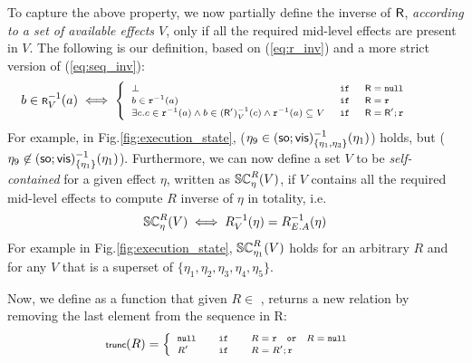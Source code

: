 To capture the above property, we now partially define the 
inverse of ${\normalfont \textsf{R}}$, \emph{according to a set of available effects $V$}, 
only if all the required mid-level effects are present in $V$.
The following is our definition, based on (\ref{eq:r_inv}) and a more
strict version of (\ref{eq:seq_inv}):
\begin{equation}
\label{eq:R_inv}
\scriptsize
b \in {\normalfont \textsf{R}}^{-1}_V(a) \iff
\begin{cases}
\begin{array} {lllll} 
\bot & \;\mathtt {if}\; & {\normalfont \textsf{R}} = \mathtt{null}& & \\
b \in \mathtt{r}^{-1}(a) & \;\mathtt {if}\; & {\normalfont \textsf{R}}=\mathtt{r} & & \\
\exists c. c \in
\mathtt{r}^{-1}(a) \wedge b \in ({\normalfont \textsf{R}}')_V^{-1}(c) \wedge
\mathtt{r}^{-1}(a) \subseteq V   & \;\mathtt {if}\; & {\normalfont \textsf{R}}={\normalfont \textsf{R}}';\mathtt{r} & & \;
\end{array}
\end{cases}
\end{equation}
For example, in Fig.\ref{fig:execution_state}, 
{\footnotesize  ($\eta_9 \in
({\textsf{so}};{\normalfont \textsf{vis}})_{\{\eta_1,\eta_3\}}^{-1}(\eta_1)$)}
holds, but {\footnotesize($\eta_9 \not\in ({\textsf{so}};{\normalfont \textsf{vis}})_{\{\eta_1\}}^{-1}(\eta_1)$)}. 
Furthermore, we can now define a set $V$ to be \emph{self-contained} for
a given effect $\eta$,
written as {\footnotesize $\SC
R \eta V$}, if $V$ contains all the required mid-level effects to compute
$R$ inverse of $\eta$ in totality, i.e.
\begin{equation}
\scriptsize 
\SC R \eta {V} \iff R^{-1}_V(\eta) = R^{-1}_{E.A}(\eta)
\end{equation}
For example in Fig.\ref{fig:execution_state}, {\footnotesize $\SC R
{\eta_1} V$} holds for an arbitrary  $R$ and for any $V$ that is a superset of
{\footnotesize $\{\eta_1,\eta_2,\eta_3,\eta_4,\eta_5\}$}.

Now, we define {\footnotesize \trunc{}} as a function that
given  $R \in$ \relationS{}, 
returns a new relation by removing the last element from the sequence
in R:
\begin{equation}
\scriptsize
\trunc{R} = 
\begin{cases}
\begin{array}{lcl}
\nullR & \quad \myif \quad & R = \rel \quad \mathtt{or} \quad R = \nullR \\
R' & \quad \myif \quad & R = R';\rel 
\end{array}
\end{cases}
\end{equation}


